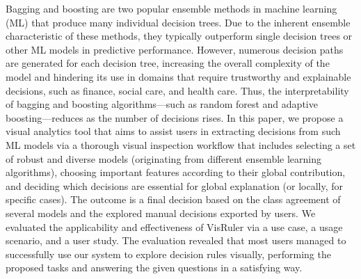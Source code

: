 Bagging and boosting are two popular ensemble methods in machine learning (ML) that produce many individual decision trees. Due to the inherent ensemble characteristic of these methods, they typically outperform single decision trees or other ML models in predictive performance. However, numerous decision paths are generated for each decision tree, increasing the overall complexity of the model and hindering its use in domains that require trustworthy and explainable decisions, such as finance, social care, and health care. Thus, the interpretability of bagging and boosting algorithms---such as random forest and adaptive boosting---reduces as the number of decisions rises. In this paper, we propose a visual analytics tool that aims to assist users in extracting decisions from such ML models via a thorough visual inspection workflow that includes selecting a set of robust and diverse models (originating from different ensemble learning algorithms), choosing important features according to their global contribution, and deciding which decisions are essential for global explanation (or locally, for specific cases). The outcome is a final decision based on the class agreement of several models and the explored manual decisions exported by users. We evaluated the applicability and effectiveness of VisRuler via a use case, a usage scenario, and a user study. 
%
The evaluation revealed that most users managed to successfully use our system to explore decision rules visually, performing the proposed tasks and answering the given questions in a satisfying way.
